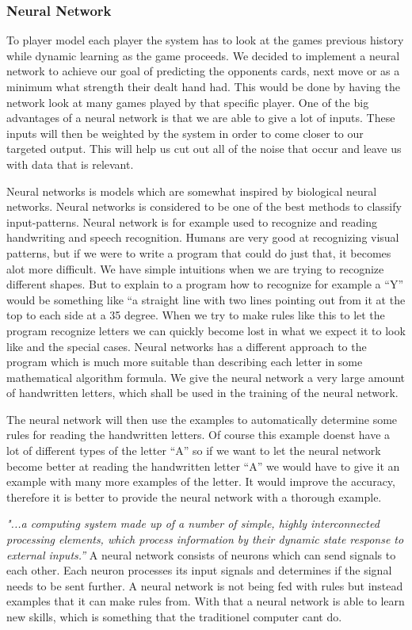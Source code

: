 \subsubsection{Neural Network}
To player model each player the system has to look at the games previous history while dynamic learning as the game proceeds.
We decided to implement a neural network to achieve our goal of predicting the opponents cards, next move or as a minimum what strength their dealt hand had. This would be done by having the network look at many games played by that specific player.
One of the big advantages of a neural network is that we are able to give a lot of inputs. These inputs will then be weighted by the system in order to come closer to our targeted output.
This will help us cut out all of the noise that occur and leave us with data that is relevant.

Neural networks is models which are somewhat inspired by biological neural networks. Neural networks is considered to be one of the best methods to classify input-patterns. Neural network is for example used to recognize and reading handwriting and speech recognition.
Humans are very good at recognizing visual patterns, but if we were to write a program that could do just that, it becomes alot more difficult. We have simple intuitions when we are trying to recognize different shapes. But to explain to a program how to recognize for example a “Y” would be something like “a straight line with two lines pointing out from it at the top to each side at a 35 degree. When we try to make rules like this to let the program recognize letters we can quickly become lost in what we expect it to look like and the special cases.
Neural networks has a different approach to the program which is much more suitable than describing each letter in some mathematical algorithm formula.
We give the neural network a very large amount of handwritten letters, which shall be used in the training of the neural network.

The neural network will then use the examples to automatically determine some rules for reading the handwritten letters. Of course this example doenst have a lot of different types of the letter “A” so if we want to let the neural network become better at reading the handwritten letter “A” we would have to give it an example with many more examples of the letter. It would improve the accuracy, therefore it is better to provide the neural network with a thorough example.


\textit{"...a computing system made up of a number of simple, highly interconnected processing elements, which process information by their dynamic state response to external inputs.”}
A neural network consists of neurons which can send signals to each other. Each neuron processes its input signals and determines if the signal needs to be sent further. 
A neural network is not being fed with rules but instead examples that it can make rules from. With that a neural network is able to learn new skills, which is something that the traditionel computer cant do.

